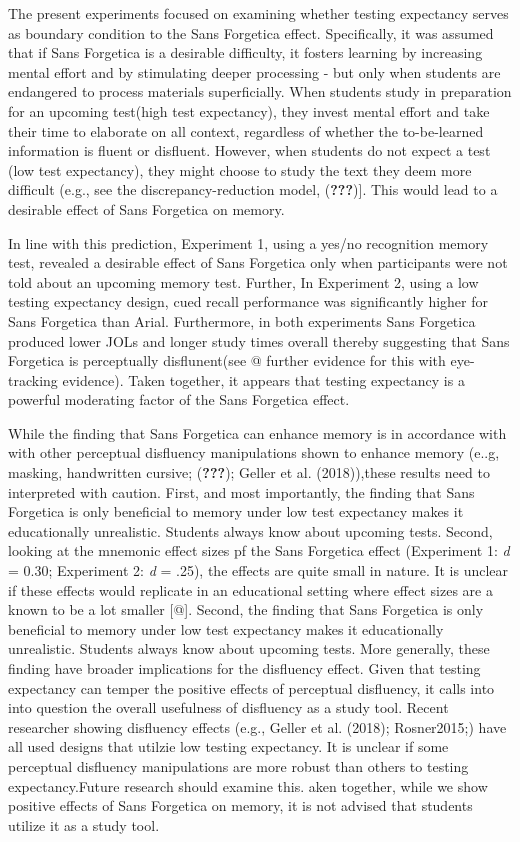 \documentclass[
  english,
  jou]{apa6}
\begin{document}
The present experiments focused on examining whether testing expectancy serves as boundary condition to the Sans Forgetica effect. Specifically, it was assumed that if Sans Forgetica is a desirable difficulty, it fosters learning by increasing mental effort and by stimulating deeper processing - but only when students are endangered to process materials superficially. When students study in preparation for an upcoming test(high test expectancy), they invest mental effort and take their time to elaborate on all context, regardless of whether the to-be-learned information is fluent or disfluent. However, when students do not expect a test (low test expectancy), they might choose to study the text they deem more difficult (e.g., see the discrepancy-reduction model, ({\textbf{???}}){]}. This would lead to a desirable effect of Sans Forgetica on memory.

In line with this prediction, Experiment 1, using a yes/no recognition memory test, revealed a desirable effect of Sans Forgetica only when participants were not told about an upcoming memory test. Further, In Experiment 2, using a low testing expectancy design, cued recall performance was significantly higher for Sans Forgetica than Arial. Furthermore, in both experiments Sans Forgetica produced lower JOLs and longer study times overall thereby suggesting that Sans Forgetica is perceptually disflunent(see @ further evidence for this with eye-tracking evidence). Taken together, it appears that testing expectancy is a powerful moderating factor of the Sans Forgetica effect.

While the finding that Sans Forgetica can enhance memory is in accordance with with other perceptual disfluency manipulations shown to enhance memory (e..g, masking, handwritten cursive; ({\textbf{???}}); Geller et al. (2018)),these results need to interpreted with caution. First, and most importantly, the finding that Sans Forgetica is only beneficial to memory under low test expectancy makes it educationally unrealistic. Students always know about upcoming tests. Second, looking at the mnemonic effect sizes pf the Sans Forgetica effect (Experiment 1: \emph{d} = 0.30; Experiment 2: \emph{d} = .25), the effects are quite small in nature. It is unclear if these effects would replicate in an educational setting where effect sizes are a known to be a lot smaller {[}@{]}. Second, the finding that Sans Forgetica is only beneficial to memory under low test expectancy makes it educationally unrealistic. Students always know about upcoming tests. More generally, these finding have broader implications for the disfluency effect. Given that testing expectancy can temper the positive effects of perceptual disfluency, it calls into into question the overall usefulness of disfluency as a study tool. Recent researcher showing disfluency effects (e.g., Geller et al. (2018); Rosner2015;) have all used designs that utilzie low testing expectancy. It is unclear if some perceptual disfluency manipulations are more robust than others to testing expectancy.Future research should examine this. aken together, while we show positive effects of Sans Forgetica on memory, it is not advised that students utilize it as a study tool.
\end{document}
